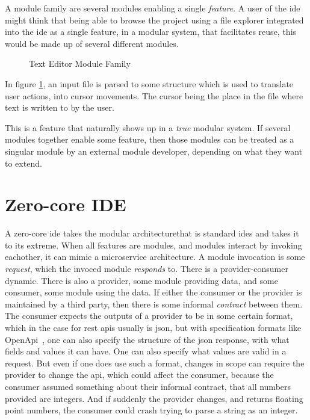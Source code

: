 A module family are several modules enabling a single
\textit{feature}. A user of the \gls*{ide} might think that being able to browse
the project using a file explorer integrated into the \gls*{ide} as a single
feature, in a modular system, that facilitates reuse, this would be made up of
several different modules.

\begin{figure}
  \centering
  
  \caption{Text Editor Module Family}
  \label{fig:textEditorSimple}
\end{figure}

In figure \ref{fig:textEditorSimple}, an input file is parsed to some structure
which is used to translate user actions, into cursor movements. The cursor being
the place in the file where text is written to by the user.

This is a feature that naturally shows up in a \textit{true} modular system. If
several modules together enable some feature, then those modules can be treated
as a singular module by an external module developer, depending on what they
want to extend.


\section{Zero-core IDE}

A zero-core \gls*{ide} takes the modular architecturethat is standard \gls*{ide}s
and takes it to its extreme. When all features are modules, and modules interact
by invoking eachother, it can mimic a microservice architecture. A module
invocation is some \textit{request}, which the invoced module \textit{responds}
to. There is a provider-consumer dynamic. There is also a provider, some module
providing data, and some consumer, some module using the data. If either the
consumer or the provider is maintained by a third party, then there is some
informal \textit{contract} between them. The consumer expects the outputs of a
provider to be in some certain format, which in the case for \gls*{rest}
\gls*{api}s usually is \gls*{json}, but with specification formats like OpenApi~\cite{openApi},
one can also specify the structure of the \gls*{json} response, with what fields
and values it can have. One can also specify what values are valid in a request.
But even if one does use such a format, changes in scope can require the
provider to change the \gls*{api}, which could affect the consumer, because the
consumer assumed something about their informal contract, that all numbers
provided are integers. And if suddenly the provider changes, and returns
floating point numbers, the consumer could crash trying to parse a string as an
integer.

